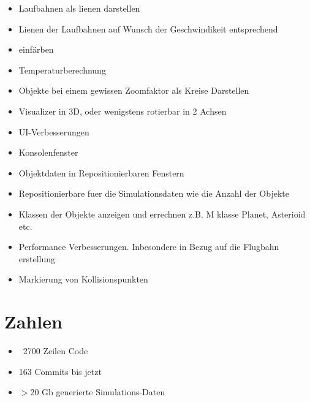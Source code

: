 \begin{itemize}
    \item Laufbahnen als lienen darstellen
    \item Lienen der Laufbahnen auf Wunsch der Geschwindikeit entsprechend
    \item einfärben
    \item Temperaturberechnung
    \item Objekte bei einem gewissen Zoomfaktor als Kreise Darstellen
    \item Visualizer in 3D, oder wenigstens rotierbar in 2 Achsen
    \item UI-Verbesserungen
    \item Konsolenfenster
    \item Objektdaten in Repositionierbaren Fenstern
    \item Repositionierbare fuer die Simulationsdaten wie die Anzahl der Objekte
    \item Klassen der Objekte anzeigen und errechnen z.B. M klasse Planet, Asterioid etc.
    \item Performance Verbesserungen. Inbesondere in Bezug auf die Flugbahn erstellung
    \item Markierung von Kollisionspunkten


\end{itemize}

\section{Zahlen}
\begin{itemize}
    \item ~2700 Zeilen Code
    \item 163 Commits bis jetzt
    \item $>$20 Gb generierte Simulations-Daten
\end{itemize}


